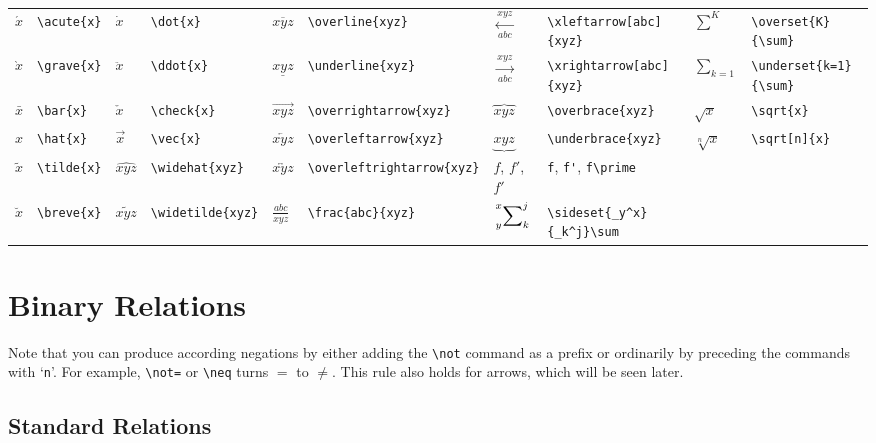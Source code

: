 \documentclass[10pt, english]{article}
\begin{document}
	\begin{center}
		\scriptsize
	\begin{tabular}{ll|ll|ll|ll|ll}
		$\acute{x}$ & \verb|\acute{x}| & $\dot{x}$ & \verb|\dot{x}| & $\overline{xyz}$ & \verb|\overline{xyz}| & $\xleftarrow[abc]{xyz}$ & \verb|\xleftarrow[abc]{xyz}| & $\overset{K}{\sum}$ & \verb|\overset{K}{\sum}| \\
		$\grave{x}$ & \verb|\grave{x}| & $\ddot{x}$ & \verb|\ddot{x}| & $\underline{xyz}$ & \verb|\underline{xyz}| & $\xrightarrow[abc]{xyz}$ & \verb|\xrightarrow[abc]{xyz}| & $\underset{k=1}{\sum}$ & \verb|\underset{k=1}{\sum}| \\
		$\bar{x}$ & \verb|\bar{x}| & $\check{x}$ & \verb|\check{x}| & $\overrightarrow{xyz}$ & \verb|\overrightarrow{xyz}| & $\overbrace{xyz}$ & \verb|\overbrace{xyz}| & $\sqrt{x}$ & \verb|\sqrt{x}| \\
		$\hat{x}$ & \verb|\hat{x}| & $\vec{x}$ & \verb|\vec{x}| & $\overleftarrow{xyz}$ & \verb|\overleftarrow{xyz}| & $\underbrace{xyz}$ & \verb|\underbrace{xyz}| & $\sqrt[n]{x}$ & \verb|\sqrt[n]{x}| \\
		$\tilde{x}$ & \verb|\tilde{x}| & $\widehat{xyz}$ & \verb|\widehat{xyz}| & $\overleftrightarrow{xyz}$ & \verb|\overleftrightarrow{xyz}| & $f$, $f'$, $f\prime$ & \verb|f|, \verb|f'|, \verb|f\prime| \\
		$\breve{x}$ & \verb|\breve{x}| & $\widetilde{xyz}$ & \verb|\widetilde{xyz}| & $\frac{abc}{xyz}$ & \verb|\frac{abc}{xyz}| & $\sideset{_y^x}{_k^j}\sum$ & \verb|\sideset{_y^x}{_k^j}\sum| \\
	\end{tabular}
	\end{center}

	\newpage

\section{Binary Relations}

	Note that you can produce according negations by either adding the \verb|\not| command as a prefix or ordinarily by preceding the commands with `\verb|n|'. For example, \verb|\not=| or \verb|\neq| turns $=$ to $\neq$. This rule also holds for arrows, which will be seen later.

	\subsection{Standard Relations}
\end{document}
